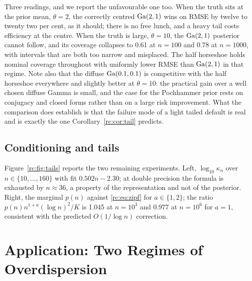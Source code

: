Three readings, and we report the unfavourable one too. When the truth sits at the prior mean, $\theta=2$, the correctly centred $\mathrm{Ga}(2,1)$ wins on RMSE by twelve to twenty two per cent, as it should; there is no free lunch, and a heavy tail costs efficiency at the centre. When the truth is large, $\theta=10$, the $\mathrm{Ga}(2,1)$ posterior cannot follow, and its coverage collapses to 0.61 at $n=100$ and 0.78 at $n=1000$, with intervals that are both too narrow and misplaced. The half horseshoe holds nominal coverage throughout with uniformly lower RMSE than $\mathrm{Ga}(2,1)$ in that regime. Note also that the diffuse $\mathrm{Ga}(0.1,0.1)$ is competitive with the half horseshoe everywhere and slightly better at $\theta=10$: the practical gain over a well chosen diffuse Gamma is small, and the case for the Pochhammer prior rests on conjugacy and closed forms rather than on a large risk improvement. What the comparison does establish is that the failure mode of a light tailed default is real and is exactly the one Corollary~\ref{rc:cor:tail} predicts.

\subsection{Conditioning and tails}

Figure~\ref{rc:fig:tails} reports the two remaining experiments. Left, $\log_{10}\kappa_n$ over $n\in\{10,\dots,160\}$ with fit $0.502n-2.30$; at double precision the formula is exhausted by $n\approx36$, a property of the representation and not of the posterior. Right, the marginal $p(n)$ against \eqref{rc:eq:zipf} for $a\in\{1,2\}$; the ratio $p(n)n^{1+a}(\log n)^2/K$ is 1.045 at $n=10^3$ and 0.977 at $n=10^6$ for $a=1$, consistent with the predicted $O(1/\log n)$ correction.

\section{Application: Two Regimes of Overdispersion}\label{rc:sec:app}

